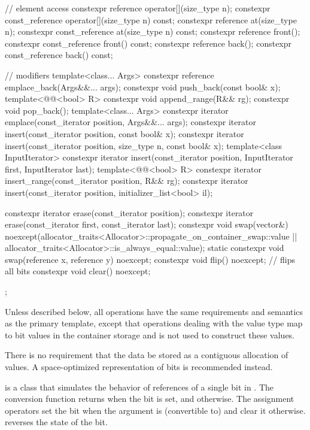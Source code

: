 \begin{codeblock}
{{    // element access
    constexpr reference       operator[](size_type n);
    constexpr const_reference operator[](size_type n) const;
    constexpr reference       at(size_type n);
    constexpr const_reference at(size_type n) const;
    constexpr reference       front();
    constexpr const_reference front() const;
    constexpr reference       back();
    constexpr const_reference back() const;

    // modifiers
    template<class... Args> constexpr reference emplace_back(Args&&... args);
    constexpr void push_back(const bool& x);
    template<@@<bool> R>
      constexpr void append_range(R&& rg);
    constexpr void pop_back();
    template<class... Args> constexpr iterator emplace(const_iterator position, Args&&... args);
    constexpr iterator insert(const_iterator position, const bool& x);
    constexpr iterator insert(const_iterator position, size_type n, const bool& x);
    template<class InputIterator>
      constexpr iterator insert(const_iterator position,
                                InputIterator first, InputIterator last);
    template<@@<bool> R>
      constexpr iterator insert_range(const_iterator position, R&& rg);
    constexpr iterator insert(const_iterator position, initializer_list<bool> il);

    constexpr iterator erase(const_iterator position);
    constexpr iterator erase(const_iterator first, const_iterator last);
    constexpr void swap(vector&)
      noexcept(allocator_traits<Allocator>::propagate_on_container_swap::value ||
               allocator_traits<Allocator>::is_always_equal::value);
    static constexpr void swap(reference x, reference y) noexcept;
    constexpr void flip() noexcept;     // flips all bits
    constexpr void clear() noexcept;
  };
}
\end{codeblock}%

\pnum
Unless described below, all operations have the same requirements and
semantics as the primary  template, except that operations
dealing with the  value type map to bit values in the
container storage and
is not used to construct these values.

\pnum
There is no requirement that the data be stored as a contiguous allocation
of  values. A space-optimized representation of bits is
recommended instead.

\pnum
{}
is a class that simulates the behavior of references of a single bit in
. The conversion function returns 
when the bit is set, and  otherwise. The assignment operators
set the bit when the argument is (convertible to)  and
clear it otherwise.  reverses the state of the bit.

